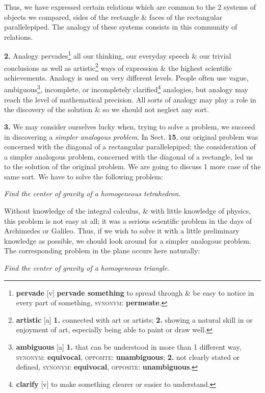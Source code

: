 \documentclass[oneside]{book}
\numberwithin{equation}{section}
\begin{document}
Thus, we have expressed certain relations which are common to the 2 systems of objects we compared, sides of the rectangle \& faces of the rectangular parallelepiped. The analogy of these systems consists in this community of relations.

\textbf{2.} Analogy pervades\footnote{\textbf{pervade} [v] \textbf{pervade something} to spread through \& be easy to notice in every part of something, \textsc{synonym}: \textbf{permeate}.} all our thinking, our everyday speech \& our trivial conclusions as well as artistic\footnote{\textbf{artistic} [a] \textbf{1.} connected with art or artists; \textbf{2.} showing a natural skill in or enjoyment of art, especially being able to paint or draw well.} ways of expression \& the highest scientific achievements. Analogy is used on very different levels. People often use vague, ambiguous\footnote{\textbf{ambiguous} [a] \textbf{1.} that can be understood in more than 1 different way, \textsc{synonym}: \textbf{equivocal}, \textsc{opposite}: \textbf{unambiguous}; \textbf{2.} not clearly stated or defined, \textsc{synonym}: \textbf{equivocal}, \textsc{opposite}: \textbf{unambiguous}.}, incomplete, or incompletely clarified\footnote{\textbf{clarify} [v] to make something clearer or easier to understand.} analogies, but analogy may reach the level of mathematical precision. All sorts of analogy may play a role in the discovery of the solution \& so we should not neglect any sort.

\textbf{3.} We may consider ourselves lucky when, trying to solve a problem, we succeed in discovering a \textit{simpler analogous problem}. In Sect. \textbf{15}, our original problem was concerned with the diagonal of a rectangular parallelepiped; the consideration of a simpler analogous problem, concerned with the diagonal of a rectangle, led us to the solution of the original problem. We are going to discuss 1 more case of the same sort. We have to solve the following problem:

\textit{Find the center of gravity of a homogeneous tetrahedron}.

Without knowledge of the integral calculus, \& with little knowledge of physics, this problem is not easy at all; it was a serious scientific problem in the days of Archimedes or Galileo. Thus, if we wish to solve it with a little preliminary knowledge as possible, we should look around for a simpler analogous problem. The corresponding problem in the plane occurs here naturally:

\textit{Find the center of gravity of a homogeneous triangle}.
\end{document}
